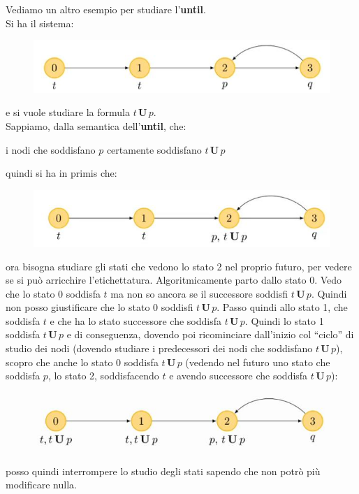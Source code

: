 \documentclass[a4paper,12pt, oneside]{book}
\begin{document}
\newpage
Vediamo un altro esempio per studiare l'\textbf{until}.\\
Si ha il sistema:
\begin{figure}[H]
  \centering
  \includegraphics[scale = 0.5]{img/4c6.jpg} 
\end{figure}
e si vuole studiare la formula $t\,\mathbf{U}\,p$.\\
Sappiamo, dalla semantica dell'\textbf{until}, che:
\begin{center}
  i nodi che soddisfano $p$ certamente soddisfano $t\,\mathbf{U}\,p$
\end{center}
quindi si ha in primis che:
\begin{figure}[H]
  \centering
  \includegraphics[scale = 0.5]{img/4c7.jpg} 
\end{figure}
ora bisogna studiare gli stati che vedono lo stato 2 nel proprio futuro, per
vedere se si può arricchire l'etichettatura. Algoritmicamente parto dallo stato
0. Vedo che lo stato 0 soddisfa $t$ ma non so ancora se il successore soddisfi
$t\,\mathbf{U}\,p$. Quindi non posso giustificare che lo stato 0 soddisfi
$t\,\mathbf{U}\,p$. Passo quindi allo stato 1, che soddisfa $t$ e che ha lo
stato successore che soddisfa $t\,\mathbf{U}\,p$. Quindi lo stato 1 soddisfa
$t\,\mathbf{U}\,p$ e di conseguenza, dovendo poi ricominciare dall'inizio col
``ciclo'' di studio dei nodi (dovendo studiare i predecessori dei nodi che
soddisfano $t\,\mathbf{U}\,p$), scopro che anche lo stato 0 soddisfa
$t\,\mathbf{U}\,p$ (vedendo nel futuro uno stato che soddisfa $p$, lo stato 2,
soddisfacendo $t$ e avendo successore che soddisfa $t\,\mathbf{U}\,p$): 
\begin{figure}[H]
  \centering
  \includegraphics[scale = 0.5]{img/4c8.jpg} 
\end{figure}
posso quindi interrompere lo studio degli stati sapendo che non potrò più
modificare nulla.
\end{document}
